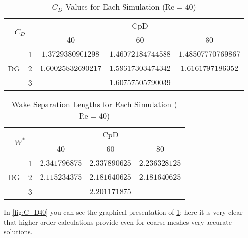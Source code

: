 \begin{table}[htp]
	\centering
	\def\arraystretch{1.5}
		\begin{tabular}{|c|c|c|c|c|}
			\hline
			\multicolumn{2}{|c|}{\multirow{2}{*}{$C_D$}} & \multicolumn{3}{c|}{CpD} \\ \cline{3-5} 
			\multicolumn{2}{|c|}{}                       & 40     & 60    & 80    \\ \hline
			\multirow{3}{*}{DG}            & 1           &   $1.3729380901298$     &     $1.46072184744588$  &     $1.48507770769867$   \\ \cline{2-5} 
			& 2           &     $1.60025832690217$   &   $1.59617303474342$    &     $1.6161797186352$   \\ \cline{2-5} 
			& 3           &      -  &     $1.60757505790039$  &     -   \\ \hline
		\end{tabular}
		\caption[$C_D$ Values for each simulation]{$C_D$ Values for Each Simulation ($\text{Re} = 40$)}	
		\label{C_D40}
	\end{table}
	\begin{table}[htp]
	\centering
	\def\arraystretch{1.5}
		\begin{tabular}{|c|c|c|c|c|}
			\hline
			\multicolumn{2}{|c|}{\multirow{2}{*}{$W^*$}} & \multicolumn{3}{c|}{CpD} \\ \cline{3-5} 
			\multicolumn{2}{|c|}{}                       & 40     & 60    & 80    \\ \hline
			\multirow{3}{*}{DG}            & 1           &    $2.341796875$    &    $2.337890625$   &    $2.236328125$    \\ \cline{2-5} 
			& 2           &     $2.115234375$   &    $2.181640625$   &     $2.181640625$   \\ \cline{2-5} 
			& 3           &     -   &    $2.201171875$   &    -    \\ \hline
		\end{tabular}
		\caption{Wake Separation Lengths for Each Simulation ($\text{Re} = 40$)}	
		\label{W40}
\end{table}
In \cref{fig:C_D40} you can see the graphical presentation of \cref{C_D40}; here it is very clear that higher order calculations provide even for coarse meshes very accurate solutions. \\\indent
